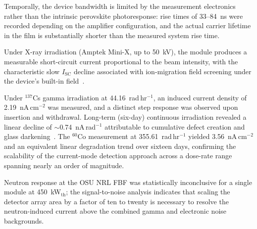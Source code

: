 Temporally, the device bandwidth is limited by the measurement
electronics rather than the intrinsic perovskite photoresponse:
rise times of 33--84~ns were recorded depending on the amplifier
configuration, and the actual carrier lifetime in the film is
substantially shorter than the measured system rise time.

Under X-ray irradiation (Amptek Mini-X, up to 50~kV), the module
produces a measurable short-circuit current proportional to the
beam intensity, with the characteristic slow $I_{\mathrm{SC}}$ decline
associated with ion-migration field screening under the device's
built-in field~\cite{Thiesbrummel2024ionmig}.

Under $^{137}$Cs gamma irradiation at 44.16~rad\,hr$^{-1}$,
an induced current density of 2.19~nA\,cm$^{-2}$ was measured,
and a distinct step response was observed upon insertion and
withdrawal.  Long-term (six-day) continuous irradiation revealed a
linear decline of $\sim$0.74~nA\,rad$^{-1}$ attributable to
cumulative defect creation and glass darkening~\cite{Boldyreva2020gammarad,Boldyreva2024cs137}.
The $^{60}$Co measurement at 355.61~rad\,hr$^{-1}$ yielded
3.56~nA\,cm$^{-2}$ and an equivalent linear degradation trend over
sixteen days, confirming the scalability of the current-mode detection
approach across a dose-rate range spanning nearly an order of magnitude.

Neutron response at the OSU NRL FBF was statistically inconclusive
for a single module at 450~kW$_{\mathrm{th}}$; the signal-to-noise
analysis indicates that scaling the detector array area by a factor
of ten to twenty is necessary to resolve the neutron-induced current
above the combined gamma and electronic noise backgrounds.